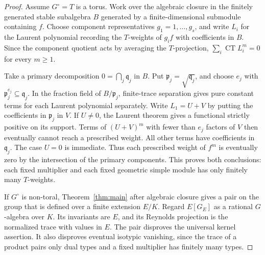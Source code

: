 \documentclass[11pt]{article}
\newcommand{\CT}{\operatorname{CT}}
\begin{document}
\begin{proof}
Assume \(G^\circ=T\) is a torus. Work over the algebraic closure
in the finitely generated stable subalgebra \(B\) generated by a
finite-dimensional submodule containing \(f\). Choose component
representatives \(g_1=1,\ldots,g_s\), and write \(L_i\) for the
Laurent polynomial recording the \(T\)-weights of \(g_i f\) with
coefficients in \(B\). Since the component quotient acts by averaging
the \(T\)-projection, \(\sum_i\CT L_i^m=0\) for every \(m\ge1\).

Take a primary decomposition \(0=\bigcap_j\mathfrak q_j\) in \(B\).
Put \(\mathfrak p_j=\sqrt{\mathfrak q_j}\), and choose \(e_j\) with
\(\mathfrak p_j^{e_j}\subseteq\mathfrak q_j\).
In the fraction field of \(B/\mathfrak p_j\), finite-trace separation
\cite[Lemma~7.1]{Complex} gives pure constant terms for each Laurent
polynomial separately. Write \(L_1=U+V\) by putting the coefficients
in \(\mathfrak p_j\) in \(V\). If \(U\ne0\), the Laurent theorem gives
a functional strictly positive on its support. Terms of \((U+V)^m\)
with fewer than \(e_j\) factors of \(V\) then eventually cannot
reach a prescribed weight. All other terms have coefficients in
\(\mathfrak q_j\). The case \(U=0\) is immediate. Thus each prescribed
weight of \(f^m\) is eventually zero by the intersection of the
primary components. This proves both conclusions: each fixed
multiplier and each fixed geometric simple module has only finitely
many \(T\)-weights.

If \(G^\circ\) is non-toral, Theorem~\ref{thm:main} after algebraic
closure gives a pair on the group that is defined over a finite
extension \(E/K\). Regard \(E[G_E]\) as a rational \(G\)-algebra
over \(K\). Its invariants are \(E\), and its Reynolds projection
is the normalized trace with values in \(E\). The pair disproves
the universal kernel assertion. It also disproves eventual isotypic
vanishing, since the trace of a product pairs only dual types and
a fixed multiplier has finitely many types.
\end{proof}
\end{document}
